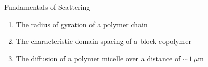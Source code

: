 \begin{activity}{Fundamentals of Scattering}
\begin{ctqs}
		\begin{enumerate}
		
			\item The radius of gyration of a polymer chain
			
			\item The characteristic domain spacing of a block copolymer
			
			\item The diffusion of a polymer micelle over a distance of $\sim 1~\mu$m
			
		\end{enumerate}
	
\end{ctqs}



	


%
%	


	
\end{activity}